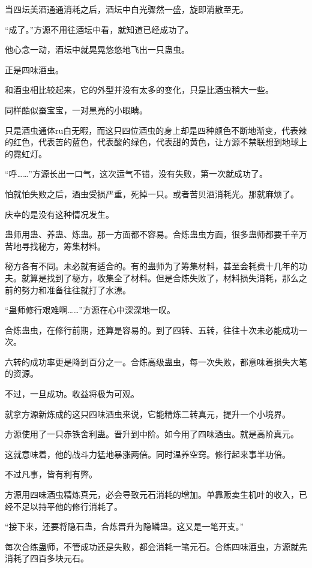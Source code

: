 \begin{this_body}
当四坛美酒通通消耗之后，酒坛中白光骤然一盛，旋即消散至无。

“成了。”方源不用往酒坛中看，就知道已经成功了。

他心念一动，酒坛中就晃晃悠悠地飞出一只蛊虫。

正是四味酒虫。

和酒虫相比较起来，它的外型并没有太多的变化，只是比酒虫稍大一些。

同样酷似蚕宝宝，一对黑亮的小眼睛。

只是酒虫通体ru白无暇，而这只四位酒虫的身上却是四种颜色不断地渐变，代表辣的红色，代表苦的蓝色，代表酸的绿色，代表甜的黄色，让方源不禁联想到地球上的霓虹灯。

“呼……”方源长出一口气，这次运气不错，没有失败，第一次就成功了。

怕就怕失败之后，酒虫受损严重，死掉一只。或者苦贝酒消耗光。那就麻烦了。

庆幸的是没有这种情况发生。

蛊师用蛊、养蛊、炼蛊。那一方面都不容易。合炼蛊虫方面，很多蛊师都要千辛万苦地寻找秘方，筹集材料。

秘方各有不同。未必就有适合的。有的蛊师为了筹集材料，甚至会耗费十几年的功夫。就算是找到了秘方，收集全了材料。但是合炼失败了，材料损失消耗，那么之前的努力和准备往往就打了水漂。

“蛊师修行艰难啊……”方源在心中深深地一叹。

合炼蛊虫，在修行前期，还算是容易的。到了四转、五转，往往十次未必能成功一次。

六转的成功率更是降到百分之一。合炼高级蛊虫，每一次失败，都意味着损失大笔的资源。

不过，一旦成功。收益将极为可观。

就拿方源新炼成的这只四味酒虫来说，它能精炼二转真元，提升一个小境界。

方源使用了一只赤铁舍利蛊。晋升到中阶。如今用了四味酒虫。就是高阶真元。

这就意味着，他的战斗力猛地暴涨两倍。同时温养空窍。修行起来事半功倍。

不过凡事，皆有利有弊。

方源用四味酒虫精炼真元，必会导致元石消耗的增加。单靠贩卖生机叶的收入，已经不足以持平他的修行消耗了。

“接下来，还要将隐石蛊，合炼晋升为隐鳞蛊。这又是一笔开支。”

每次合练蛊师，不管成功还是失败，都会消耗一笔元石。合练四味酒虫，方源就先消耗了四百多块元石。


\end{this_body}
